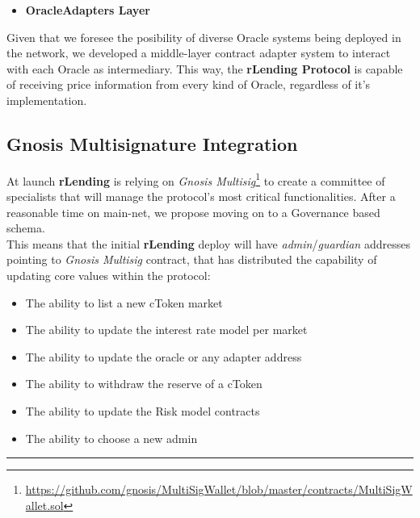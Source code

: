 \documentclass{article}
\begin{document}
\begin{itemize}
\item\textbf{OracleAdapters Layer}
\end{itemize}

Given that we foresee the posibility of diverse Oracle systems being deployed in the network, we developed a middle-layer contract adapter system to interact with each Oracle as intermediary. This way, the \textbf{rLending Protocol} is capable of receiving price information from every kind of Oracle, regardless of it's implementation.

\subsection{Gnosis Multisignature Integration}

At launch \textbf{rLending} is relying on \textit{Gnosis Multisig}\footnote{\href{https://github.com/gnosis/MultiSigWallet/blob/master/contracts/MultiSigWallet.sol}{https://github.com/gnosis/MultiSigWallet/blob/master/contracts/MultiSigWallet.sol}} to create a committee of specialists that will manage the protocol's most critical functionalities. After a reasonable time on main-net, we propose moving on to a Governance based schema.\\
This means that the initial \textbf{rLending} deploy will have \textit{admin}/\textit{guardian} addresses pointing to \textit{Gnosis Multisig} contract, that has distributed the capability of updating core values within the protocol:

\begin{itemize}
\item The ability to list a new cToken market
\item The ability to update the interest rate model per market
\item The ability to update the oracle or any adapter address
\item The ability to withdraw the reserve of a cToken
\item The ability to update the Risk model contracts
\item The ability to choose a new admin
\end{itemize}

\begin{center}
\noindent\rule{8cm}{0.4pt}
\end{center}

\end{document}
